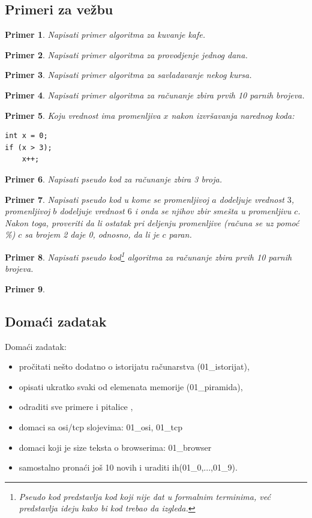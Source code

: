 \documentclass[a4paper]{article}
\newtheorem{primer}{Primer}[section]
\begin{document}
\subsection{Primeri za vežbu}
\begin{primer}
Napisati primer algoritma za kuvanje kafe.
\end{primer}
\begin{primer}
Napisati primer algoritma za provodjenje jednog dana.
\end{primer}
\begin{primer}
Napisati primer algoritma za savladavanje nekog kursa. 
\end{primer}
\begin{primer}
Napisati primer algoritma za računanje zbira prvih 10 parnih brojeva.
\end{primer}
\begin{primer}
Koju vrednost ima promenljiva $x$ nakon izvršavanja narednog koda:
\begin{verbatim}
int x = 0;
if (x > 3);
    x++;
\end{verbatim}
\end{primer}
\begin{primer}
Napisati pseudo kod za računanje zbira 3 broja.
\end{primer}
\begin{primer}
Napisati pseudo kod u kome se promenljivoj $a$ dodeljuje vrednost $3$, promenljivoj $b$ dodeljuje vrednost $6$ i onda se njihov zbir smešta u promenljivu $c$. Nakon toga, proveriti da li ostatak pri deljenju promenljive (računa se uz pomoć \%) $c$ sa brojem 2 daje 0, odnosno, da li je $c$ paran.
\end{primer}
\begin{primer}
Napisati pseudo kod\footnote{Pseudo kod predstavlja kod koji nije dat u formalnim terminima, već predstavlja ideju kako bi kod trebao da izgleda.} algoritma za računanje zbira prvih 10 parnih brojeva.
\end{primer}
\begin{primer}

\end{primer}

\subsection{Domaći zadatak}
Domaći zadatak:
\begin{itemize}
\item pročitati nešto dodatno o istorijatu računarstva (01\_istorijat), 
\item opisati ukratko svaki od elemenata memorije (01\_piramida),
\item odraditi sve primere i pitalice ,
\item domaci sa osi/tcp slojevima: 01\_osi, 01\_tcp
\item domaci koji je size teksta o browserima: 01\_browser
\item samostalno pronaći još 10 novih i uraditi ih(01\_0,...,01\_9).
\end{itemize}
\newpage
\end{document}

